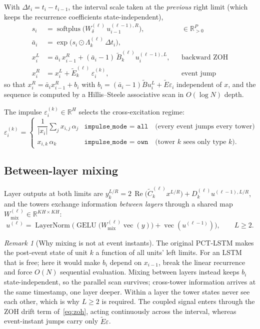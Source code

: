 \documentclass[11pt]{article}
\theoremstyle{remark}
\newtheorem{remark}{Remark}
\newcommand{\R}{\mathbb{R}}
\newcommand{\Real}{\operatorname{Re}}
\newcommand{\softplus}{\operatorname{softplus}}
\newcommand{\LN}{\operatorname{LayerNorm}}
\begin{document}
With $\Delta t_i = t_i - t_{i-1}$, the interval scale taken at the
\emph{previous} right limit (which keeps the recurrence coefficients
state-independent),
\begin{align}
s_i &= \softplus\!\big(W^{(\ell)}_\delta\, u^{(\ell-1),R}_{i-1}\big), &&\in \R^{P}_{>0}\\
\bar a_i &= \exp\!\big(s_i \odot \Lambda^{(\ell)}_k\, \Delta t_i\big), \\
x^{L}_i &= \bar a_i\, x^{R}_{i-1}
   + (\bar a_i - 1)\,\tilde B^{(\ell)}_k u^{(\ell-1),L}_i,
   && \text{backward ZOH} \label{eq:zoh}\\
x^{R}_i &= x^{L}_i + \tilde E^{(\ell)}_k\, \varepsilon_i^{(k)},
   && \text{event jump}
\end{align}
so that $x^R_i = \bar a_i x^R_{i-1} + b_i$ with
$b_i = (\bar a_i - 1)\tilde B u^L_i + \tilde E \varepsilon_i$ independent of
$x$, and the sequence is computed by a Hillis--Steele associative scan in
$O(\log N)$ depth.

The impulse $\varepsilon^{(k)}_i \in \R^H$ selects the cross-excitation regime:
\begin{equation}
\varepsilon^{(k)}_i =
\begin{cases}
\dfrac{1}{|x_i|}\sum_j x_{i,j}\,\alpha_j & \texttt{impulse\_mode = all}
  \quad\text{(every event jumps every tower)}\\[6pt]
x_{i,k}\,\alpha_k & \texttt{impulse\_mode = own}
  \quad\text{(tower $k$ sees only type $k$)} .
\end{cases}
\end{equation}

\subsection{Between-layer mixing}

Layer outputs at both limits are
$y^{L/R}_k = 2\,\Real\big(\tilde C^{(\ell)}_k x^{L/R}\big) + D^{(\ell)}_k u^{(\ell-1),L/R}$,
and the towers exchange information \emph{between layers} through a shared map
$W_{\mathrm{mix}}^{(\ell)} \in \R^{KH \times KH}$:
\begin{equation}
u^{(\ell)} = \LN\!\Big(\operatorname{GELU}\big(W^{(\ell)}_{\mathrm{mix}}
\operatorname{vec}(y)\big) + \operatorname{vec}(u^{(\ell-1)})\Big),
\qquad L \ge 2 .
\label{eq:mix}
\end{equation}

\begin{remark}[Why mixing is not at event instants]
The original PCT-LSTM makes the post-event state of unit $k$ a function of all
units' left limits. For an LSTM that is free; here it would make $b_i$ depend
on $x_{i-1}$, break the linear recurrence and force $O(N)$ sequential
evaluation. Mixing between layers instead keeps $b_i$ state-independent, so the
parallel scan survives; cross-tower information arrives at the same timestamp,
one layer deeper. Within a layer the tower states never see each other, which
is why $L \ge 2$ is required. The coupled signal enters through the ZOH drift
term of~\eqref{eq:zoh}, acting continuously across the interval, whereas
event-instant jumps carry only $\tilde E \varepsilon$.
\end{remark}
\end{document}
